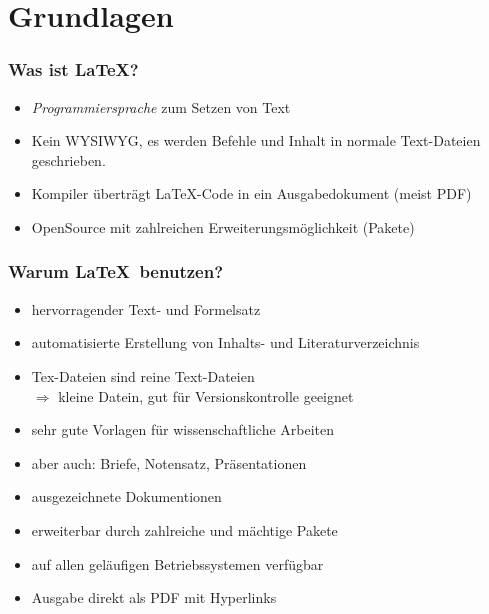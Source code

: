 \section{Grundlagen}
\begin{frame}
    \frametitle{Was ist \LaTeX?}
    \TEST
    \begin{itemize}
        \item \emph{Programmiersprache} zum Setzen von Text
        \item Kein WYSIWYG, es werden Befehle und Inhalt in normale Text-Dateien geschrieben.
        \item Kompiler überträgt \LaTeX-Code in ein Ausgabedokument (meist PDF)
        \item OpenSource mit zahlreichen Erweiterungsmöglichkeit (Pakete)
    \end{itemize}
\end{frame}
\begin{frame}
    \frametitle{Warum \LaTeX \ benutzen?}
    \begin{itemize}
        \item hervorragender Text- und Formelsatz
        \item automatisierte Erstellung von Inhalts- und Literaturverzeichnis
        \item Tex-Dateien sind reine Text-Dateien \\
              $\Rightarrow$ kleine Datein, gut für Versionskontrolle geeignet
        \item sehr gute Vorlagen für wissenschaftliche Arbeiten 
        \item aber auch: Briefe, Notensatz, Präsentationen 
        \item ausgezeichnete Dokumentionen
        \item erweiterbar durch zahlreiche und mächtige Pakete
        \item auf allen geläufigen Betriebssystemen verfügbar
        \item Ausgabe direkt als PDF mit Hyperlinks
    \end{itemize}
\end{frame}

